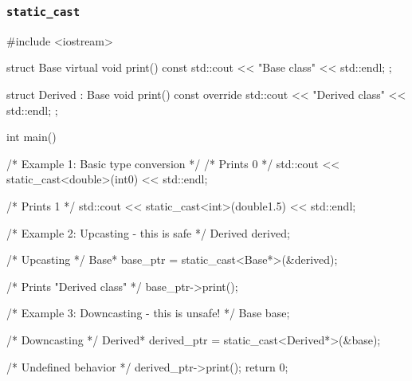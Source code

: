 \documentclass[../main]{subfiles}
\begin{document}
        \subsubsection{\texttt{static\_cast}}
        \begin{Code}
            #include <iostream>
            
            struct Base
            {
                virtual void print() const
                {
                    std::cout << "Base class" << std::endl;
                }
            };
            
            struct Derived : Base
            {
                void print() const override
                {
                    std::cout << "Derived class" << std::endl;
                }
            };
            
            int main()
            {
                /* Example 1: Basic type conversion */
                /* Prints 0 */
                std::cout << static_cast<double>(int{0}) << std::endl;
                
                /* Prints 1 */
                std::cout << static_cast<int>(double{1.5}) << std::endl;
            
            
                /* Example 2: Upcasting - this is safe */
                Derived derived{};
                
                /* Upcasting */
                Base* base_ptr = static_cast<Base*>(&derived);
                
                /* Prints "Derived class" */
                base_ptr->print();
            
            
                /* Example 3: Downcasting - this is unsafe! */
                Base base{};
                
                /* Downcasting */
                Derived* derived_ptr = static_cast<Derived*>(&base);
                
                /* Undefined behavior */
                derived_ptr->print();
                return 0;
            }           
        \end{Code}
        
\end{document}
